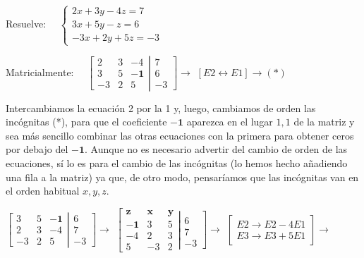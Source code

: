 \begin{ejre} Resuelve: $\quad \begin{cases}2x+3y-4z=7\\3x+5y-z=6\\-3x+2y+5z=-3\end{cases}$ 
\end{ejre}
\begin{proofw}\renewcommand{\qedsymbol}{$\diamond$}
Matricialmente: $\quad \left[ \begin{matrix}
  2 & 3 & -4 \\ 3 & 5 & \boldsymbol{-1} \\ -3 & 2 & 5 
 \end{matrix}\right. 
 \left| \begin{matrix}
  7 \\ 6 \\ -3 
 \end{matrix}\right] \to$ 
\textcolor{gris}{$[E2 \leftrightarrow E1 ] \to (*)$}

Intercambiamos la ecuación 2 por la 1 y, luego, cambiamos de orden las incógnitas (*), para que el coeficiente $\boldsymbol{-1}$ aparezca en el lugar $1,1$ de la matriz y sea más sencillo combinar las otras ecuaciones con la primera para obtener ceros por debajo del $\boldsymbol{-1}$. Aunque no es necesario advertir del cambio de orden de las ecuaciones, sí lo es para el cambio de las incógnitas (lo hemos hecho añadiendo una fila a la matriz) ya que, de otro modo, pensaríamos que las incógnitas van en el orden habitual $x,y,z$.

$\left[ \begin{matrix}
  3 & 5 & \boldsymbol{-1} \\ 2 & 3 & -4 \\ -3 & 2 & 5 
 \end{matrix}\right. 
 \left| \begin{matrix}
  6 \\ 7 \\ -3  
 \end{matrix}\right] \to$
 $\left[ \begin{matrix}
  \boldsymbol{z} &  \boldsymbol{x} &  \boldsymbol{y} \\
  \boldsymbol{-1} & 3 & 5 \\ -4 & 2 & 3 \\ 5 & -3 & 2 
 \end{matrix}\right. 
 \left| \begin{matrix}
  \\ 6 \\ 7 \\ -3 
 \end{matrix}\right] \to$
 \textcolor{gris}{$\left[ \begin{matrix} E2 \to E2-4E1 \\ E3 \to E3+5E1 \end{matrix} \right] \to $}
 

\end{proofw}
